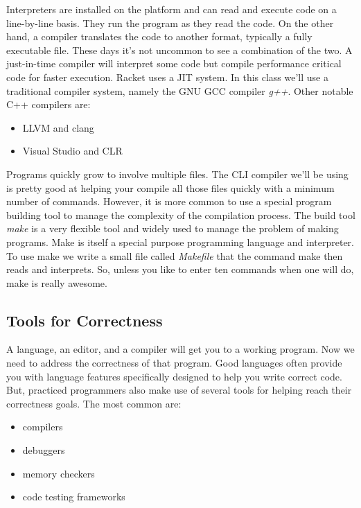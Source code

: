\documentclass[]{tufte-handout}
\begin{document}
Interpreters are installed on the platform and can read and execute code on a line-by-line basis. They run the program as they read the code. On the other hand, a compiler translates the code to another format, typically a fully executable file. These days it's not uncommon to see a combination of the two. A just-in-time compiler will interpret some code but compile performance critical code for faster execution. Racket uses a JIT system.  In this class we'll use a traditional compiler system, namely the GNU GCC compiler \textit{g++}. Other notable C++ compilers are:
\begin{itemize}
\item LLVM and clang 	
\item Visual Studio and CLR 
\end{itemize}

Programs quickly grow to involve multiple files. The CLI compiler we'll be using is pretty good at helping your compile all those files quickly with a minimum number of commands. However, it is more common to use a special program building tool to manage the complexity of the compilation process. The build tool \textit{make} is a very flexible tool and widely used to manage the problem of making programs.  Make is itself a special purpose programming language and interpreter. To use make we write a small file called \textit{Makefile} that the command make then reads and interprets.  So, unless you like to enter ten commands when one will do, make is really awesome.  



\subsection{Tools for Correctness}

A language, an editor, and a compiler will get you to a working program. Now we need to address the correctness of that program. Good languages often provide you with language features specifically designed to help you write correct code. But, practiced programmers also make use of several tools for helping reach their correctness goals.  The most common are:
\begin{itemize}
\item compilers
\item debuggers
\item memory checkers
\item code testing frameworks
\end{itemize}
\end{document}
